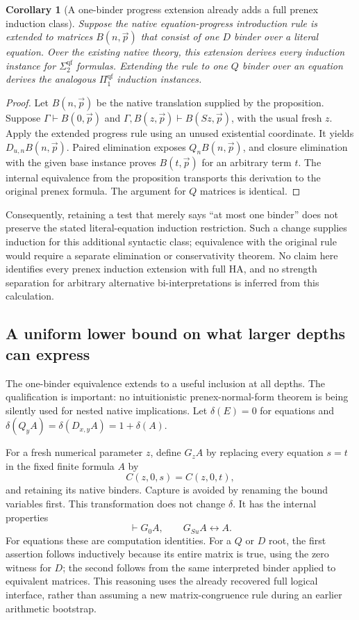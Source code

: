 \documentclass[11pt]{article}
\newtheorem{corollary}[theorem]{Corollary}
\theoremstyle{definition}\newtheorem{definition}[theorem]{Definition}
\begin{document}
\begin{corollary}[A one-binder progress extension already adds a full
prenex induction class]
Suppose the native equation-progress introduction rule is extended to
matrices $B(n,\vec p)$ that consist of one $D$ binder over a literal
equation. Over the existing native theory, this extension derives every
induction instance for $\Sigma_2^{\mathrm{qf}}$ formulas. Extending the
rule to one $Q$ binder over an equation derives the analogous
$\Pi_1^{\mathrm{qf}}$ induction instances.
\end{corollary}

\begin{proof}
Let $B(n,\vec p)$ be the native translation supplied by the proposition.
Suppose $\Gamma\vdash B(0,\vec p)$ and
$\Gamma,B(z,\vec p)\vdash B(Sz,\vec p)$, with the usual fresh $z$.
Apply the extended progress rule using an unused existential coordinate.
It yields $D_{u,n}B(n,\vec p)$. Paired elimination exposes
$Q_nB(n,\vec p)$, and closure elimination with the given base instance
proves $B(t,\vec p)$ for an arbitrary term $t$. The internal equivalence
from the proposition transports this derivation to the original prenex
formula. The argument for $Q$ matrices is identical.
\end{proof}

Consequently, retaining a test that merely says ``at most one binder''
does not preserve the stated literal-equation induction restriction.
Such a change supplies induction for this additional syntactic class;
equivalence with the original rule would require a separate elimination
or conservativity theorem. No claim here identifies every prenex
induction extension with full HA, and no strength separation for
arbitrary alternative bi-interpretations is inferred from this calculation.

\subsection{A uniform lower bound on what larger depths can express}

The one-binder equivalence extends to a useful inclusion at all depths.
The qualification is important: no intuitionistic prenex-normal-form
theorem is being silently used for nested native implications.
Let $\delta(E)=0$ for equations and
$\delta(Q_yA)=\delta(D_{x,y}A)=1+\delta(A)$.

For a fresh numerical parameter $z$, define $G_zA$ by replacing every
equation $s=t$ in the fixed finite formula $A$ by
\[
                 C(z,0,s)=C(z,0,t),
\]
and retaining its native binders. Capture is avoided by renaming the
bound variables first. This transformation does not change $\delta$.
It has the internal properties
\[
             \vdash G_0A,\qquad G_{Su}A\leftrightarrow A.
\tag{Gate}\label{eq:depth-gate}
\]
For equations these are computation identities. For a $Q$ or $D$ root,
the first assertion follows inductively because its entire matrix is
true, using the zero witness for $D$; the second follows from the same
interpreted binder applied to equivalent matrices. This reasoning uses
the already recovered full logical interface, rather than assuming a
new matrix-congruence rule during an earlier arithmetic bootstrap.
\end{document}
